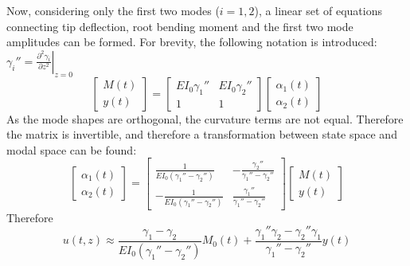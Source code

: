 Now, considering only the first two modes ($i = 1, 2$), a linear set of equations connecting tip deflection, root bending moment and the first two mode amplitudes can be formed. For brevity, the following notation is introduced: $\gamma_i '' = \left.\frac{\partial ^2 \gamma_i}{\partial z^2}\right\vert_{z=0}$
\begin{equation}
    \begin{bmatrix}
    M(t) \\ y(t)
    \end{bmatrix}
    =     \begin{bmatrix}
    EI_0\gamma_1'' & EI_0\gamma_2'' \\
    1 & 1
    \end{bmatrix}
        \begin{bmatrix}
    \alpha_1(t) \\ \alpha_2(t)
    \end{bmatrix}
\end{equation}
As the mode shapes are orthogonal, the curvature terms are not equal. Therefore the matrix is invertible, and therefore a transformation between state space and modal space can be found:
\begin{equation}
        \begin{bmatrix}
    \alpha_1(t) \\ \alpha_2(t)
    \end{bmatrix}
    =    
    \begin{bmatrix}
    \frac{1}{EI_0(\gamma_1'' - \gamma_2'')} & -\frac{\gamma_2''}{\gamma_1'' - \gamma_2''} \\
    -\frac{1}{EI_0(\gamma_1'' - \gamma_2'')} & \frac{\gamma_1''}{\gamma_1'' - \gamma_2''}
    \end{bmatrix}
 \begin{bmatrix}
    M(t) \\ y(t)
    \end{bmatrix}
\end{equation}
Therefore
\begin{equation}
    u(t, z) \approx \frac{\gamma_1 - \gamma_2}{EI_0(\gamma_1'' - \gamma_2'')}M_0(t) + \frac{\gamma_1''\gamma_2 - \gamma_2''\gamma_1}{\gamma_1'' - \gamma_2''}y(t)
\end{equation}




